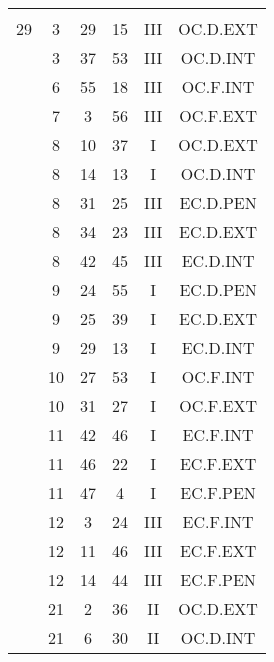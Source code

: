 \documentclass[12pt, a4paper]{article}
\begin{document}
\begin{multicols}{3}
{\begin{tabular}{c c c c c c}
	 	 	 	 & & & & & \\%
	 	 	 	29 & 3 & 29 & 15 & III & OC.D.EXT\\%
	 	 	 	 & 3 & 37 & 53 & III & OC.D.INT\\%
	 	 	 	 & 6 & 55 & 18 & III & OC.F.INT\\%
	 	 	 	 & 7 & 3 & 56 & III & OC.F.EXT\\%
	 	 	 	 & 8 & 10 & 37 & I & OC.D.EXT\\%
	 	 	 	 & 8 & 14 & 13 & I & OC.D.INT\\%
	 	 	 	 & 8 & 31 & 25 & III & EC.D.PEN\\%
	 	 	 	 & 8 & 34 & 23 & III & EC.D.EXT\\%
	 	 	 	 & 8 & 42 & 45 & III & EC.D.INT\\%
	 	 	 	 & 9 & 24 & 55 & I & EC.D.PEN\\%
	 	 	 	 & 9 & 25 & 39 & I & EC.D.EXT\\%
	 	 	 	 & 9 & 29 & 13 & I & EC.D.INT\\%
	 	 	 	 & 10 & 27 & 53 & I & OC.F.INT\\%
	 	 	 	 & 10 & 31 & 27 & I & OC.F.EXT\\%
	 	 	 	 & 11 & 42 & 46 & I & EC.F.INT\\%
	 	 	 	 & 11 & 46 & 22 & I & EC.F.EXT\\%
	 	 	 	 & 11 & 47 & 4 & I & EC.F.PEN\\%
	 	 	 	 & 12 & 3 & 24 & III & EC.F.INT\\%
	 	 	 	 & 12 & 11 & 46 & III & EC.F.EXT\\%
	 	 	 	 & 12 & 14 & 44 & III & EC.F.PEN\\%
	 	 	 	 & 21 & 2 & 36 & II & OC.D.EXT\\%
	 	 	 	 & 21 & 6 & 30 & II & OC.D.INT\\%

\end{tabular}}
\end{multicols}
\end{document}
